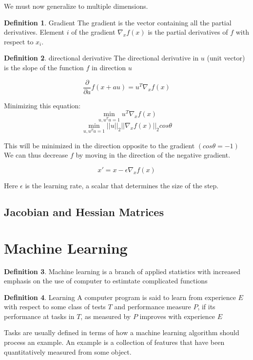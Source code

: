 \documentclass{article}
\theoremstyle{definition}
\newtheorem{definition}{Definition}[section]
\begin{document}
We must now generalize to multiple dimensions.

\begin{definition}{Gradient}
The gradient is the vector containing all the partial derivatives. Element $i$ of the gradient $ \nabla_xf(x)$ is the partial derivatives of $f$ with respect to $x_i$. 
\end{definition}

\begin{definition}{directional derivative}
The directional derivative in $u$ (unit vector) is the slope of the function $f$ in direction $u$

$$ \frac{\partial}{\partial a} f(x + au) = u^T\nabla_xf(x) $$
\end{definition}

Minimizing this equation:
$$ \min_{u, u^Tu=1} u^T\nabla_xf(x) $$
$$ \min_{u, u^Tu=1} ||u||_2 ||\nabla_xf(x)||_2 cos\theta $$

This will be minimized in the direction opposite to the gradient $(cos \theta = -1)$ We can thus decrease $f$ by moving in the direction of the negative gradient.

$$ x' = x - \epsilon\nabla_xf(x) $$

Here $\epsilon$ is the learning rate, a scalar that determines the size of the step.

\subsection{Jacobian and Hessian Matrices}


\section{Machine Learning}

\begin{definition}
Machine learning is a branch of applied statistics with increased emphasis on the use of computer to estimtate complicated functions
\end{definition}

\begin{definition}
{Learning} A computer program is said to learn from experience $E$ with respect to some class of tests $T$ and performance measure $P$, if its performance at tasks in $T$, as measured by $P$ improves with experience $E$
\end{definition}

Tasks are usually defined in terms of how a machine learning algorithm should process an example. An example is a collection of features that have been quantitatively measured from some object.
\end{document}
